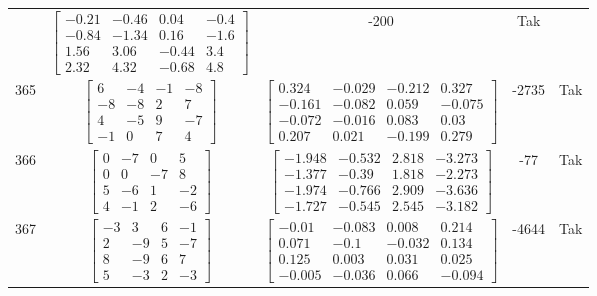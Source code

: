 \documentclass[a4paper,12pt]{article}
\begin{document}
\begin{tabular}{c c c c c}
&
$\begin{bmatrix} -0.21 & -0.46 & 0.04 & -0.4 \\ -0.84 & -1.34 & 0.16 & -1.6 \\ 1.56 & 3.06 & -0.44 & 3.4 \\ 2.32 & 4.32 & -0.68 & 4.8 \end{bmatrix}$
&
-200
&
Tak
\\
365
&
$\begin{bmatrix} 6 & -4 & -1 & -8 \\ -8 & -8 & 2 & 7 \\ 4 & -5 & 9 & -7 \\ -1 & 0 & 7 & 4 \end{bmatrix}$
&
$\begin{bmatrix} 0.324 & -0.029 & -0.212 & 0.327 \\ -0.161 & -0.082 & 0.059 & -0.075 \\ -0.072 & -0.016 & 0.083 & 0.03 \\ 0.207 & 0.021 & -0.199 & 0.279 \end{bmatrix}$
&
-2735
&
Tak
\\
366
&
$\begin{bmatrix} 0 & -7 & 0 & 5 \\ 0 & 0 & -7 & 8 \\ 5 & -6 & 1 & -2 \\ 4 & -1 & 2 & -6 \end{bmatrix}$
&
$\begin{bmatrix} -1.948 & -0.532 & 2.818 & -3.273 \\ -1.377 & -0.39 & 1.818 & -2.273 \\ -1.974 & -0.766 & 2.909 & -3.636 \\ -1.727 & -0.545 & 2.545 & -3.182 \end{bmatrix}$
&
-77
&
Tak
\\
367
&
$\begin{bmatrix} -3 & 3 & 6 & -1 \\ 2 & -9 & 5 & -7 \\ 8 & -9 & 6 & 7 \\ 5 & -3 & 2 & -3 \end{bmatrix}$
&
$\begin{bmatrix} -0.01 & -0.083 & 0.008 & 0.214 \\ 0.071 & -0.1 & -0.032 & 0.134 \\ 0.125 & 0.003 & 0.031 & 0.025 \\ -0.005 & -0.036 & 0.066 & -0.094 \end{bmatrix}$
&
-4644
&
Tak
\\

\end{tabular}
\end{document}
